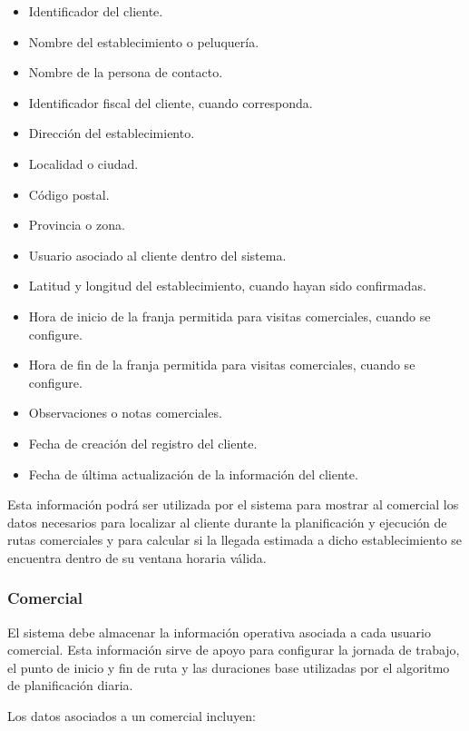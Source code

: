 \begin{itemize}
    \item Identificador del cliente.
    \item Nombre del establecimiento o peluquería.
    \item Nombre de la persona de contacto.
    \item Identificador fiscal del cliente, cuando corresponda.
    \item Dirección del establecimiento.
    \item Localidad o ciudad.
    \item Código postal.
    \item Provincia o zona.
    \item Usuario asociado al cliente dentro del sistema.
    \item Latitud y longitud del establecimiento, cuando hayan sido confirmadas.
    \item Hora de inicio de la franja permitida para visitas comerciales, cuando se configure.
    \item Hora de fin de la franja permitida para visitas comerciales, cuando se configure.
    \item Observaciones o notas comerciales.
    \item Fecha de creación del registro del cliente.
    \item Fecha de última actualización de la información del cliente.
\end{itemize}

Esta información podrá ser utilizada por el sistema para mostrar al comercial los datos necesarios para localizar al cliente durante la planificación y ejecución de rutas comerciales y para calcular si la llegada estimada a dicho establecimiento se encuentra dentro de su ventana horaria válida.

\subsubsection*{Comercial}

El sistema debe almacenar la información operativa asociada a cada usuario comercial. Esta información sirve de apoyo para configurar la jornada de trabajo, el punto de inicio y fin de ruta y las duraciones base utilizadas por el algoritmo de planificación diaria.

Los datos asociados a un comercial incluyen:


